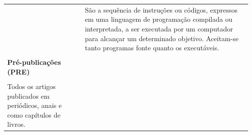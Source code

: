\begin{table}
\begin{center}
\begin{tabularx}{\textwidth}{X X}
&
São a sequência de instruções ou códigos, expressos em uma linguagem de programação compilada ou interpretada, a ser executada por um computador para alcançar um determinado objetivo. Aceitam-se tanto programas fonte quanto os executáveis.\\
\\
\textbf{Pré-publicações (PRE)} \\
\\
Todos os artigos publicados em  periódicos, anais e como capítulos de livros.
   \end{tabularx}
  \end{center}
 \end{table}

